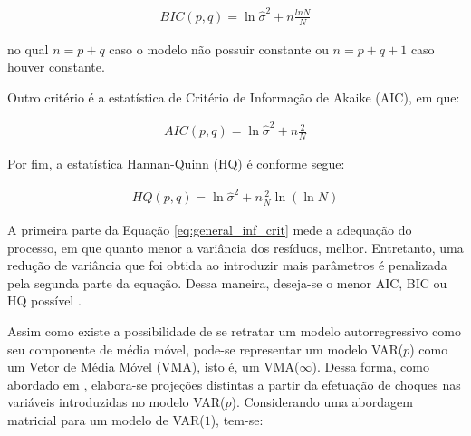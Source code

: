 \begin{ceqn}
\begin{align} \label{eq:BIC}
BIC(p,q) = \ln \hat{\sigma}^2 + n \frac{ln N}{N}
\end{align}
\end{ceqn} no qual $n = p + q$ caso o modelo não possuir constante ou $n = p + q + 1$ caso houver constante.

Outro critério é a estatística de Critério de Informação de Akaike (AIC), em que:

\begin{ceqn}
\begin{align} \label{eq:AIC}
AIC(p,q) = \ln \hat{\sigma}^2 + n \frac{2}{N}
\end{align}
\end{ceqn}

Por fim, a estatística Hannan-Quinn (HQ) é conforme segue:

\begin{ceqn}
\begin{align} \label{eq:HQ}
HQ(p,q) = \ln \hat{\sigma}^2 + n \frac{2}{N} \ln (\ln N)
\end{align}
\end{ceqn}

A primeira parte da Equação \eqref{eq:general_inf_crit} mede a adequação do processo, em que quanto menor a variância dos resíduos, melhor. Entretanto, uma redução de variância que foi obtida ao introduzir mais parâmetros é penalizada pela segunda parte da equação. Dessa maneira, deseja-se o menor AIC, BIC ou HQ possível \cite{bueno2008}.


Assim como existe a possibilidade de se retratar um modelo autorregressivo como seu componente de média móvel, pode-se representar um modelo VAR($p$) como um Vetor de Média Móvel (VMA), isto é, um VMA($\infty$). Dessa forma, como abordado em , elabora-se projeções distintas a partir da efetuação de choques nas variáveis introduzidas no modelo VAR($p$). Considerando uma abordagem matricial para um modelo de VAR($1$), tem-se:

